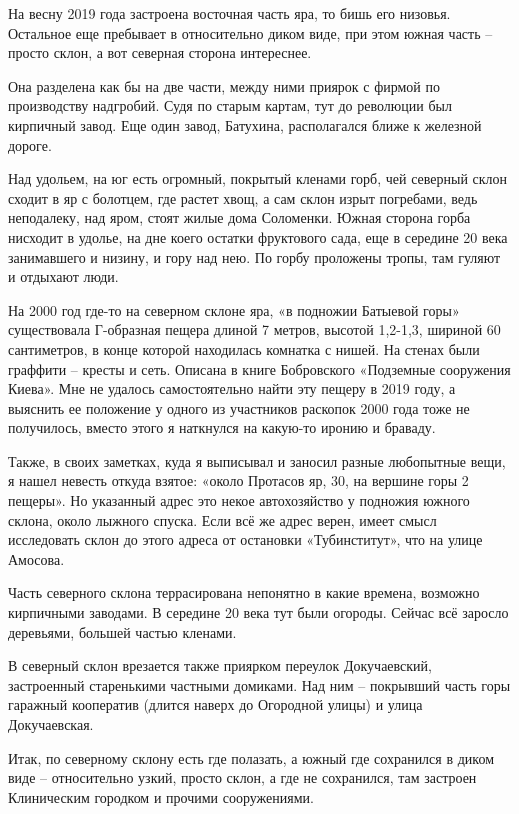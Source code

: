 На весну 2019 года застроена восточная часть яра, то бишь его низовья. Остальное еще пребывает в относительно диком виде, при этом южная часть – просто склон, а вот северная сторона интереснее.

Она разделена как бы на две части, между ними приярок с фирмой по производству надгробий. Судя по старым картам, тут до революции был кирпичный завод. Еще один завод, Батухина, располагался ближе к железной дороге.

Над удольем, на юг есть огромный, покрытый кленами горб, чей северный склон сходит в яр с болотцем, где растет хвощ, а сам склон изрыт погребами, ведь неподалеку, над яром, стоят жилые дома Соломенки. Южная сторона горба нисходит в удолье, на дне коего остатки фруктового сада, еще в середине 20 века занимавшего и низину, и гору над нею. По горбу проложены тропы, там гуляют и отдыхают люди.

На 2000 год где-то на северном склоне яра, «в подножии Батыевой горы» существовала Г-образная пещера длиной 7 метров, высотой 1,2-1,3, шириной 60 сантиметров, в конце которой находилась комнатка с нишей. На стенах были граффити – кресты и сеть. Описана в книге Бобровского «Подземные сооружения Киева». Мне не удалось самостоятельно найти эту пещеру в 2019 году, а выяснить ее положение у одного из участников раскопок 2000 года тоже не получилось, вместо этого я наткнулся на какую-то иронию и браваду.

Также, в своих заметках, куда я выписывал и заносил разные любопытные вещи, я нашел невесть откуда взятое: «около Протасов яр, 30, на вершине горы 2 пещеры». Но указанный адрес это некое автохозяйство у подножия южного склона, около лыжного спуска. Если всё же адрес верен, имеет смысл исследовать склон до этого адреса от остановки «Тубинститут», что на улице Амосова.

Часть северного склона террасирована непонятно в какие времена, возможно кирпичными заводами. В середине 20 века тут были огороды. Сейчас всё заросло деревьями, большей частью кленами.

В северный склон врезается также приярком переулок Докучаевский, застроенный старенькими частными домиками. Над ним – покрывший часть горы гаражный кооператив (длится наверх до Огородной улицы) и улица Докучаевская.

Итак, по северному склону есть где полазать, а южный где сохранился в диком виде – относительно узкий, просто склон, а где не сохранился, там застроен Клиническим городком и прочими сооружениями.

